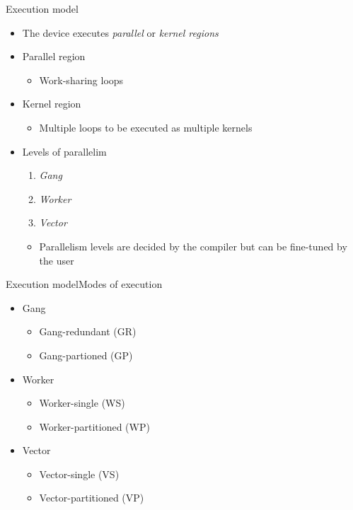 \documentclass[12pt,aspectratio=169]{beamer}
\begin{document}
\begin{frame}{Execution model}
  \begin{itemize}
  \item The device executes \emph{parallel} or \emph{kernel regions}
  \item Parallel region
    \begin{itemize}
    \item Work-sharing loops
    \end{itemize}
  \item Kernel region
    \begin{itemize}
    \item Multiple loops to be executed as multiple kernels
    \end{itemize}
  \item Levels of parallelim
    \begin{enumerate}
    \item \emph{Gang} 
    \item \emph{Worker} 
    \item \emph{Vector} 
    \end{enumerate}
    \begin{itemize}
    \item Parallelism levels are decided by the compiler but can be fine-tuned by
      the user
    \end{itemize}
  \end{itemize}
\end{frame}

\begin{frame}{Execution model}{Modes of execution}
  \begin{itemize}
  \item Gang
    \begin{itemize}
    \item Gang-redundant (GR)
    \item Gang-partioned (GP)
    \end{itemize}
  \item Worker
    \begin{itemize}
    \item Worker-single (WS)
    \item Worker-partitioned (WP)
    \end{itemize}
  \item Vector
    \begin{itemize}
    \item Vector-single (VS)
    \item Vector-partitioned (VP)
    \end{itemize}
  \end{itemize}
\end{frame}
\end{document}
